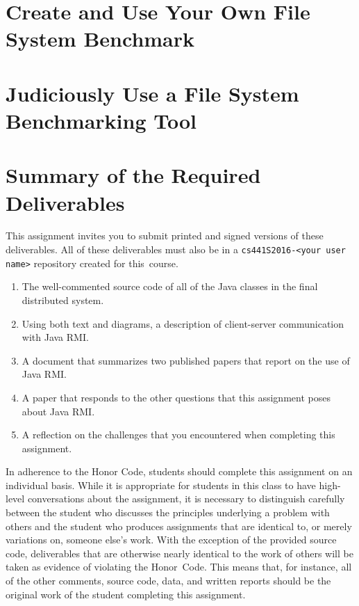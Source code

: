 \section*{Create and Use Your Own File System Benchmark}

\section*{Judiciously Use a File System Benchmarking Tool}


\section*{Summary of the Required Deliverables}

This assignment invites you to submit printed and signed versions of these deliverables. All of these deliverables must
also be in a {\tt cs441S2016-<your user name>} repository created for \mbox{this course}.

\vspace*{-.1in}

\begin{enumerate}
  \itemsep 0em

  \item The well-commented source code of all of the Java classes in the final distributed system.

  \item Using both text and diagrams, a description of client-server communication with Java RMI.

  \item A document that summarizes two published papers that report on the use of Java RMI.

  \item A paper that responds to the other questions that this assignment poses about Java RMI.

  \item A reflection on the challenges that you encountered when completing this assignment.

\end{enumerate}

\vspace*{-.1in}


In adherence to the Honor Code, students should complete this assignment on an individual basis. While it is appropriate
for students in this class to have high-level conversations about the assignment, it is necessary to distinguish
carefully between the student who discusses the principles underlying a problem with others and the student who produces
assignments that are identical to, or merely variations on, someone else's work.  With the exception of the provided
source code, deliverables that are otherwise nearly identical to the work of others will be taken as evidence of
violating the \mbox{Honor Code}. This means that, for instance, all of the other comments, source code, data, and
written reports should be the original work of the student completing this assignment.



